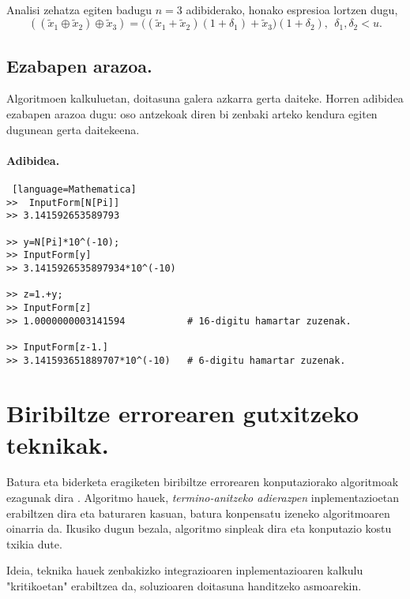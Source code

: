 \paragraph*{}Analisi zehatza egiten badugu $n=3$ adibiderako, honako espresioa lortzen dugu,
\begin{equation*}
((\tilde x_1 \oplus \tilde x_2) \oplus \tilde x_3)  = 
  \big((\tilde x_1 + \tilde x_2)(1+\delta_1)
  +\tilde x_3 \big) (1+\delta_2), \ \ \delta_1,\delta_2<u.
\end{equation*}

\subsection*{Ezabapen arazoa.}

Algoritmoen kalkuluetan, doitasuna galera azkarra gerta daiteke. Horren adibidea ezabapen arazoa dugu: oso antzekoak diren bi zenbaki arteko kendura egiten dugunean gerta daitekeena. 

\paragraph*{Adibidea.}
\begin{lstlisting} [language=Mathematica]
>>  InputForm[N[Pi]]
>> 3.141592653589793

>> y=N[Pi]*10^(-10);
>> InputForm[y]
>> 3.1415926535897934*10^(-10)

>> z=1.+y;
>> InputForm[z]
>> 1.0000000003141594           # 16-digitu hamartar zuzenak.

>> InputForm[z-1.]
>> 3.141593651889707*10^(-10)   # 6-digitu hamartar zuzenak.

\end{lstlisting}


\section{Biribiltze errorearen gutxitzeko teknikak.}
\label{sec:4.4}

Batura eta biderketa eragiketen biribiltze errorearen konputaziorako algoritmoak ezagunak dira \cite{Dekker1971}\cite{Higham2002}. Algoritmo hauek, \emph{termino-anitzeko adierazpen} inplementazioetan erabiltzen dira eta baturaren kasuan, batura konpensatu izeneko algoritmoaren oinarria da. Ikusiko dugun bezala, algoritmo sinpleak dira eta konputazio kostu txikia dute.  

Ideia, teknika hauek zenbakizko integrazioaren inplementazioaren kalkulu "kritikoetan" erabiltzea da, soluzioaren doitasuna handitzeko asmoarekin.

